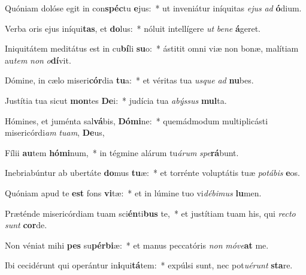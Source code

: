 \item Quóniam dolóse egit in con\textbf{spéc}tu \textbf{e}jus:~* ut inveniátur iníquitas \textit{e}\textit{jus} \textit{ad} \textbf{ó}dium.
\item Verba oris ejus iníqui\textbf{tas}, et \textbf{do}lus:~* nóluit intellígere \textit{ut} \textit{be}\textit{ne} \textbf{á}geret.
\item Iniquitátem meditátus est in cu\textbf{bí}li \textbf{su}o:~* ástitit omni viæ non bonæ, malítiam au\textit{tem} \textit{non} \textit{o}\textbf{dí}vit.
\item Dómine, in cælo miseri\textbf{cór}dia \textbf{tu}a:~* et véritas tua \textit{us}\textit{que} \textit{ad} \textbf{nu}bes.
\item Justítia tua sicut \textbf{mon}tes \textbf{De}i:~* judícia tua \textit{a}\textit{býs}\textit{sus} \textbf{mul}ta.
\item Hómines, et juménta sal\textbf{vá}bis, \textbf{Dó}\textbf{mi}ne:~* quemádmodum multiplicásti misericórdi\textit{am} \textit{tu}\textit{am}, \textbf{De}us,
\item Fílii \textbf{au}tem \textbf{hó}\textbf{mi}num,~* in tégmine alárum tu\textit{á}\textit{rum} \textit{spe}\textbf{rá}bunt.
\item Inebriabúntur ab ubertáte \textbf{do}mus \textbf{tu}æ:~* et torrénte voluptátis tuæ \textit{po}\textit{tá}\textit{bis} \textbf{e}os.
\item Quóniam apud te \textbf{est} fons \textbf{vi}tæ:~* et in lúmine tuo vi\textit{dé}\textit{bi}\textit{mus} \textbf{lu}men.
\item Præténde misericórdiam tuam sci\textbf{én}ti\textbf{bus} te,~* et justítiam tuam his, qui \textit{rec}\textit{to} \textit{sunt} \textbf{cor}de.
\item Non véniat mihi \textbf{pes} su\textbf{pér}\textbf{bi}æ:~* et manus peccatóris \textit{non} \textit{mó}\textit{ve}\textbf{at} me.
\item Ibi cecidérunt qui operántur in\textbf{i}qui\textbf{tá}tem:~* expúlsi sunt, nec pot\textit{u}\textit{é}\textit{runt} \textbf{sta}re.
